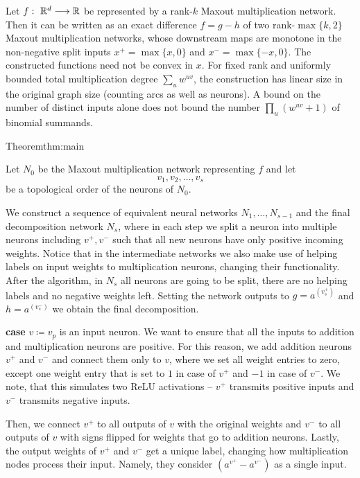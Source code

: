 \begin{theorem} \label{thm:main}
    Let $f: \ \mathbb{R}^d \longrightarrow \mathbb{R}$ be represented by a rank-$k$ Maxout multiplication network.
    Then it can be written as an exact difference $f = g - h$ of two rank-$\max\{k,2\}$ Maxout multiplication networks, whose downstream maps are monotone in the non-negative split inputs $x^+=\max\{x,0\}$ and $x^-=\max\{-x,0\}$. The constructed functions need not be convex in $x$.
    For fixed rank and uniformly bounded total multiplication degree $\sum_u w^{uv}$, the construction has linear size in the original graph size (counting arcs as well as neurons). A bound on the number of distinct inputs alone does not bound the number $\prod_u(w^{uv}+1)$ of binomial summands.
\end{theorem}

\begin{proofref}{Theorem}{thm:main}

    Let $N_0$ be the Maxout multiplication network representing $f$ and let
    $$
    v_1, v_2, \dots, v_s
    $$
    be a topological order of the neurons of $N_0$.

    We construct a sequence of equivalent neural networks $N_1, \dots, N_{s-1}$ and the final decomposition network $N_s$, where in each step we split a neuron into multiple neurons including $v^+, v^-$ such that all new neurons have only positive incoming weights.
    Notice that in the intermediate networks we also make use of helping labels on input weights to multiplication neurons, changing their functionality.
    After the algorithm, in $N_s$ all neurons are going to be split, there are no helping labels and no negative weights left. 
    Setting the network outputs to $g = a^{(v^{+}_s)}$ and $h = a^{(v^-_s)}$ we obtain the final decomposition.

    \textbf{case} $v \coloneqq v_p$ is an input neuron.
        We want to ensure that all the inputs to addition and multiplication neurons are positive.
        For this reason, we add addition neurons $v^+$ and $v^-$ and connect them only to $v$, where we set all weight entries to zero, except one weight entry that is set to $1$ in case of $v^+$ and $-1$ in case of $v^-$.
        We note, that this simulates two ReLU activations -- $v^+$ transmits positive inputs and $v^-$ transmits negative inputs.

        Then, we connect $v^+$ to all outputs of $v$ with the original weights and $v^-$ to all outputs of $v$ with signs flipped for weights that go to addition neurons.
        Lastly, the output weights of $v^+$ and $v^-$ get a unique label, changing how multiplication nodes process their input. Namely, they consider $(a^{v^+} - a^{v^-})$ as a single input.


\end{proofref}
